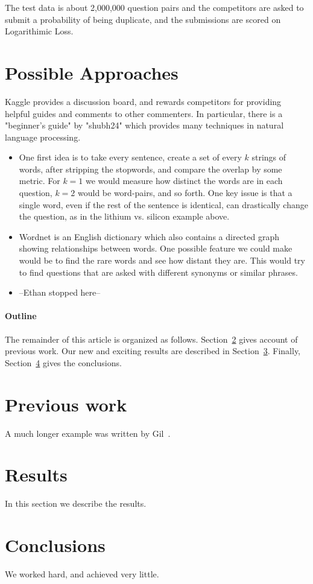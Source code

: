 \documentclass[12pt]{article}
\begin{document}
The test data is about 2,000,000 question pairs and the competitors are asked to submit a probability of being duplicate, and the submissions are scored on Logarithimic Loss.

\section{Possible Approaches}
Kaggle provides a discussion board, and rewards competitors for providing helpful guides and comments to other commenters. In particular, there is a "beginner's guide" by "shubh24" which provides many techniques in natural language processing.
\begin{itemize}
\item One first idea is to take every sentence, create a set of every $k$ strings of words, after stripping the stopwords, and compare the overlap by some metric. For $k=1$ we would measure how distinct the words are in each question, $k=2$ would be word-pairs, and so forth. One key issue is that a single word, even if the rest of the sentence is identical, can drastically change the question, as in the lithium vs. silicon example above.
\item Wordnet is an English dictionary which also contains a directed graph showing relationships between words. One possible feature we could make would be to find the rare words and see how distant they are. This would try to find questions that are asked with different synonyms or similar phrases.
\item --Ethan stopped here--
\end{itemize}

\paragraph{Outline}
The remainder of this article is organized as follows.
Section~\ref{previous work} gives account of previous work.
Our new and exciting results are described in Section~\ref{results}.
Finally, Section~\ref{conclusions} gives the conclusions.

\section{Previous work}\label{previous work}
A much longer \LaTeXe{} example was written by Gil~\cite{Gil:02}.

\section{Results}\label{results}
In this section we describe the results.

\section{Conclusions}\label{conclusions}
We worked hard, and achieved very little.



\end{document}
